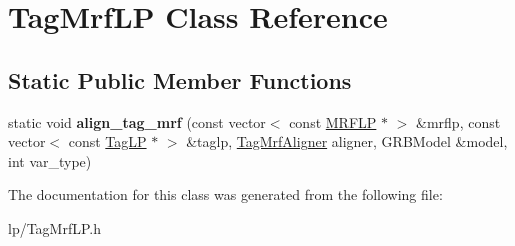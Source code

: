 \hypertarget{classTagMrfLP}{
\section{TagMrfLP Class Reference}
\label{classTagMrfLP}
}
\subsection*{Static Public Member Functions}
\begin{DoxyCompactItemize}
\item 
\hypertarget{classTagMrfLP_a7f9f963c533c5c712acca41db36f9a5a}{
static void {\bfseries align\_\-tag\_\-mrf} (const vector$<$ const \hyperlink{structMRFLP}{MRFLP} $\ast$ $>$ \&mrflp, const vector$<$ const \hyperlink{structScarab_1_1HG_1_1TagLP}{TagLP} $\ast$ $>$ \&taglp, \hyperlink{classTagMrfAligner}{TagMrfAligner} aligner, GRBModel \&model, int var\_\-type)}
\label{classTagMrfLP_a7f9f963c533c5c712acca41db36f9a5a}

\end{DoxyCompactItemize}


The documentation for this class was generated from the following file:\begin{DoxyCompactItemize}
\item 
lp/TagMrfLP.h\end{DoxyCompactItemize}
